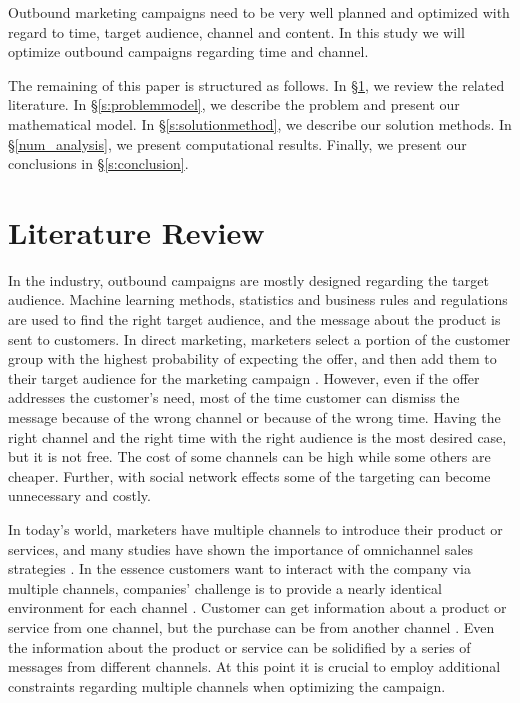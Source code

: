 \documentclass[11pt]{article}
\begin{document}
Outbound marketing campaigns need to be very well planned and optimized with regard to time, target audience, channel and content. In this study we will optimize outbound campaigns regarding time and channel.

The remaining of this paper is structured as follows. In \S \ref{s:litreview}, we review the related literature. In \S \ref{s:problemmodel}, we describe the problem and present our mathematical model. In \S \ref{s:solutionmethod}, we describe our solution methods. In \S \ref{num_analysis}, we present computational results. Finally, we present our conclusions in \S \ref{s:conclusion}.




\section{Literature Review}  \label{s:litreview}

In the industry, outbound campaigns are mostly designed regarding the target audience. Machine learning methods, statistics and business rules and regulations are used to find the right target audience, and the message about the product is sent to customers. In direct marketing, marketers select a portion of the customer group with the highest probability of expecting the offer, and then add them to their target audience for the marketing campaign \citep{owczarczuk}. However, even if the offer addresses the customer’s need, most of the time customer can dismiss the message because of the wrong channel or because of the wrong time. Having the right channel and the right time with the right audience is the most desired case, but it is not free. The cost of some channels can be high while some others are cheaper. Further, with social network effects some of the targeting can become unnecessary and costly.

In today’s world, marketers have multiple channels to introduce their product or services, and many studies have shown the importance of omnichannel sales strategies \citep{shankar, park}. In the essence customers want to interact with the company via multiple channels, companies’ challenge is to provide a nearly identical environment for each channel \citep{bell}. Customer can get information about a product or service from one channel, but the purchase can be from another channel \citep{park}. Even the information about the product or service can be solidified by a series of messages from different channels. At this point it is crucial to employ additional constraints regarding multiple channels when optimizing the campaign.
\end{document}
